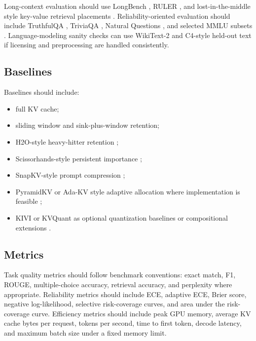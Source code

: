 Long-context evaluation should use LongBench \citep{bai2024longbench}, RULER \citep{hsieh2024ruler}, and lost-in-the-middle style key-value retrieval placements \citep{liu2024lost}. Reliability-oriented evaluation should include TruthfulQA \citep{lin2022truthfulqa}, TriviaQA \citep{joshi2017triviaqa}, Natural Questions \citep{kwiatkowski2019natural}, and selected MMLU subsets \citep{hendrycks2021mmlu}. Language-modeling sanity checks can use WikiText-2 and C4-style held-out text if licensing and preprocessing are handled consistently.

\subsection{Baselines}

Baselines should include:

\begin{itemize}[leftmargin=*]
    \item full KV cache;
    \item sliding window and sink-plus-window retention;
    \item H2O-style heavy-hitter retention \citep{zhang2023h2o};
    \item Scissorhands-style persistent importance \citep{liu2023scissorhands};
    \item SnapKV-style prompt compression \citep{li2024snapkv};
    \item PyramidKV or Ada-KV style adaptive allocation where implementation is feasible \citep{cai2024pyramidkv,feng2024adakv};
    \item KIVI or KVQuant as optional quantization baselines or compositional extensions \citep{liu2024kivi,hooper2024kvquant}.
\end{itemize}

\subsection{Metrics}

Task quality metrics should follow benchmark conventions: exact match, F1, ROUGE, multiple-choice accuracy, retrieval accuracy, and perplexity where appropriate. Reliability metrics should include ECE, adaptive ECE, Brier score, negative log-likelihood, selective risk-coverage curves, and area under the risk-coverage curve. Efficiency metrics should include peak GPU memory, average KV cache bytes per request, tokens per second, time to first token, decode latency, and maximum batch size under a fixed memory limit.

